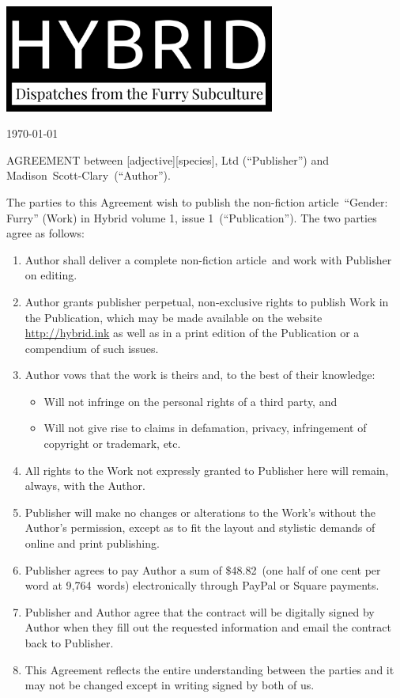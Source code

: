 \documentclass[12pt,letterpaper,oneside]{article}
\def\authorfirst{Madison}
\def\authorlast{Scott-Clary}
\def\worktitle{Gender: Furry}
\def\worktype{non-fiction article}
\def\workwords{9,764}
\def\issue{volume 1, issue 1}
\def\fee{\$48.82}
\def\rate{one half of one cent per word at \workwords\ words}
\begin{document}
  \noindent\includegraphics[width=3.5in]{logo}

  \vspace{.5in}

  \today

  \vspace{.5in}

  AGREEMENT between [adjective][species], Ltd (``Publisher'') and \authorfirst\ \authorlast\ (``Author'').

  The parties to this Agreement wish to publish the \worktype\ ``\worktitle'' (Work) in Hybrid \issue\ (``Publication''). The two parties agree as follows:

  \begin{enumerate}
    \item Author shall deliver a complete \worktype\ and work with Publisher on editing.
    \item Author grants publisher perpetual, non-exclusive rights to publish Work in the Publication, which may be made available on the website \url{http://hybrid.ink} as well as in a print edition of the Publication or a compendium of such issues.
    \item Author vows that the work is theirs and, to the best of their knowledge:
    \begin{itemize}
      \item Will not infringe on the personal rights of a third party, and
      \item Will not give rise to claims in defamation, privacy, infringement of copyright or trademark, etc.
    \end{itemize}
    \item All rights to the Work not expressly granted to Publisher here will remain, always, with the Author.
    \item Publisher will make no changes or alterations to the Work's without the Author’s permission, except as to fit the layout and stylistic demands of online and print publishing.
    \item Publisher agrees to pay Author a sum of \fee\ (\rate) electronically through PayPal or Square payments.
    \item Publisher and Author agree that the contract will be digitally signed by Author when they fill out the requested information and email the contract back to Publisher.
    \item This Agreement reflects the entire understanding between the parties and it may not be changed except in writing signed by both of us.
  \end{enumerate}
\end{document}
